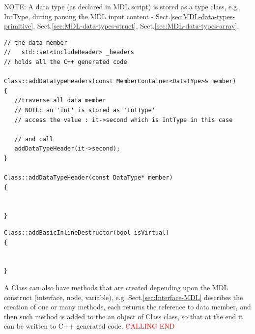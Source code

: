 NOTE: A data type (as declared in MDL script) is stored as a type class, e.g.
IntType, during parsing the MDL input content -
Sect.\ref{sec:MDL-data-types-primitive}, Sect.\ref{sec:MDL-data-types-struct},
Sect.\ref{sec:MDL-data-types-array}.


\begin{verbatim}
// the data member 
//   std::set<IncludeHeader> _headers
// holds all the C++ generated code

Class::addDataTypeHeaders(const MemberContainer<DataTYpe>& member)
{
   //traverse all data member
   // NOTE: an 'int' is stored as 'IntType'
   // access the value : it->second which is IntType in this case
   
   // and call
   addDataTypeHeader(it->second);
}

Class::addDataTypeHeader(const DataType* member)
{
   

}
\end{verbatim}


\begin{verbatim}
Class::addBasicInlineDestructor(bool isVirtual)
{
    

}
\end{verbatim}


A Class can also have methods that are created depending upon the MDL construct
(interface, node, variable), e.g.
Sect.\ref{sec:Interface-MDL} describes the creation of one or many methods, each
returns the reference to data member, and then such method is added to the an
object of Class class, so that at the end it can be written to C++ generated
code.
\textcolor{red}{CALLING END}

